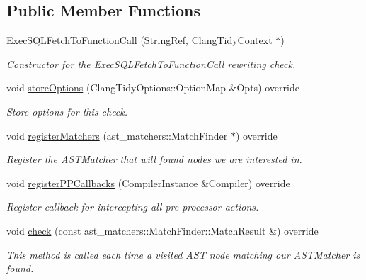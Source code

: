 \subsection*{Public Member Functions}
\begin{DoxyCompactItemize}
\item 
\hyperlink{classclang_1_1tidy_1_1pagesjaunes_1_1_exec_s_q_l_fetch_to_function_call_a1500e29a6edf8513cb3fc58538b3ebce}{Exec\+S\+Q\+L\+Fetch\+To\+Function\+Call} (String\+Ref, Clang\+Tidy\+Context $\ast$)
\begin{DoxyCompactList}\small\item\em Constructor for the \hyperlink{classclang_1_1tidy_1_1pagesjaunes_1_1_exec_s_q_l_fetch_to_function_call}{Exec\+S\+Q\+L\+Fetch\+To\+Function\+Call} rewriting check. \end{DoxyCompactList}\item 
void \hyperlink{classclang_1_1tidy_1_1pagesjaunes_1_1_exec_s_q_l_fetch_to_function_call_a9bee983a32665e3c0b6e983d05ea9786}{store\+Options} (Clang\+Tidy\+Options\+::\+Option\+Map \&Opts) override
\begin{DoxyCompactList}\small\item\em Store options for this check. \end{DoxyCompactList}\item 
void \hyperlink{classclang_1_1tidy_1_1pagesjaunes_1_1_exec_s_q_l_fetch_to_function_call_ad9864bd77a6c6c4871bb8eb9c10ac753}{register\+Matchers} (ast\+\_\+matchers\+::\+Match\+Finder $\ast$) override
\begin{DoxyCompactList}\small\item\em Register the A\+S\+T\+Matcher that will found nodes we are interested in. \end{DoxyCompactList}\item 
void \hyperlink{classclang_1_1tidy_1_1pagesjaunes_1_1_exec_s_q_l_fetch_to_function_call_af6724b81cf61f7a0d3c2289c1a6cbc8e}{register\+P\+P\+Callbacks} (Compiler\+Instance \&Compiler) override
\begin{DoxyCompactList}\small\item\em Register callback for intercepting all pre-\/processor actions. \end{DoxyCompactList}\item 
void \hyperlink{classclang_1_1tidy_1_1pagesjaunes_1_1_exec_s_q_l_fetch_to_function_call_ad12827794322cf0b75a4a5ff19db75e2}{check} (const ast\+\_\+matchers\+::\+Match\+Finder\+::\+Match\+Result \&) override
\begin{DoxyCompactList}\small\item\em This method is called each time a visited A\+ST node matching our A\+S\+T\+Matcher is found. \end{DoxyCompactList}\item 

\end{DoxyCompactItemize}
